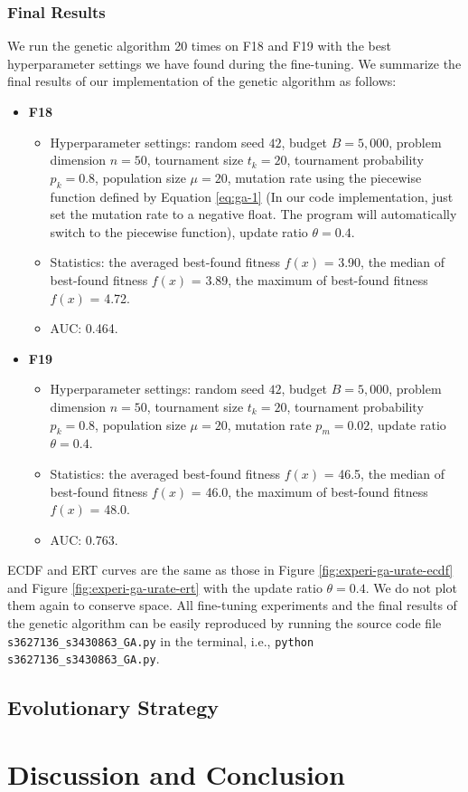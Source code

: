 \documentclass{article}
\begin{document}
\subsubsection{Final Results}
We run the genetic algorithm 20 times on F18 and F19 with the best hyperparameter settings we have found during the fine-tuning. We summarize the final results of our implementation of the genetic algorithm as follows:

\begin{itemize}
    \item \textbf{F18}
        \begin{itemize}
            \item Hyperparameter settings: random seed $42$, budget $B = 5,000$, problem dimension $n = 50$, tournament size $t_k = 20$, tournament probability $p_k = 0.8$, population size $\mu = 20$, mutation rate using the piecewise function defined by Equation \ref{eq:ga-1} (In our code implementation, just set the mutation rate to a negative float. The program will automatically switch to the piecewise function), update ratio $\theta = 0.4$.
            \item Statistics: the averaged best-found fitness $f(x)$ = 3.90, the median of best-found fitness $f(x)$ = 3.89, the maximum of best-found fitness $f(x)$ = 4.72.
            \item AUC: 0.464.
        \end{itemize}
    \item \textbf{F19}
        \begin{itemize}
            \item Hyperparameter settings: random seed $42$, budget $B = 5,000$, problem dimension $n = 50$, tournament size $t_k = 20$, tournament probability $p_k = 0.8$, population size $\mu = 20$, mutation rate $p_m = 0.02$, update ratio $\theta = 0.4$.
            \item Statistics: the averaged best-found fitness $f(x)$ = 46.5, the median of best-found fitness $f(x)$ = 46.0, the maximum of best-found fitness $f(x)$ = 48.0.
            \item AUC: 0.763.
        \end{itemize}
\end{itemize}

ECDF and ERT curves are the same as those in Figure \ref{fig:experi-ga-urate-ecdf} and Figure \ref{fig:experi-ga-urate-ert} with the update ratio $\theta = 0.4$. We do not plot them again to conserve space. All fine-tuning experiments and the final results of the genetic algorithm can be easily reproduced by running the source code file \texttt{s3627136\_s3430863\_GA.py} in the terminal, i.e., \texttt{python s3627136\_s3430863\_GA.py}.

\subsection{Evolutionary Strategy}


\section{Discussion and Conclusion}
\label{sec:dis&res}


  
  
\end{document}
